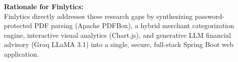 \documentclass[../Project-Report-Main.tex]{subfiles}
\begin{document}
\noindent \textbf{Rationale for Finlytics:} \\
Finlytics directly addresses these research gaps by synthesizing password-protected PDF parsing (Apache PDFBox), a hybrid merchant categorization engine, interactive visual analytics (Chart.js), and generative LLM financial advisory (Groq LLaMA 3.1) into a single, secure, full-stack Spring Boot web application.
\end{document}
